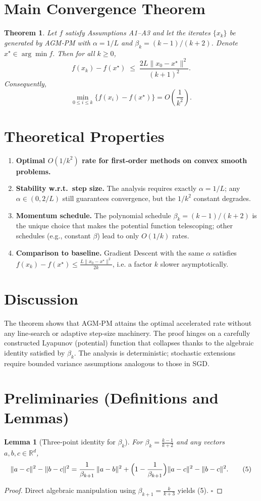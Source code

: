\documentclass{article}
\newtheorem{theorem}{Theorem}
\newtheorem{lemma}{Lemma}
\newcommand{\R}{\mathbb{R}}
\begin{document}
\section*{Main Convergence Theorem}
\begin{theorem}
\label{thm:rate}
Let $f$ satisfy Assumptions A1–A3 and let the iterates $\{x_k\}$ be generated by AGM‑PM with $\alpha=1/L$ and $\beta_k=(k-1)/(k+2)$. Denote $x^{\star}\in\arg\min f$. Then for all $k\ge 0$,
\[
f(x_k)-f(x^{\star})\;\le\;\frac{2L\|x_0-x^{\star}\|^{2}}{(k+1)^{2}}.
\tag{4}
\]
Consequently,
\[
\min_{0\le i\le k} \bigl\{f(x_i)-f(x^{\star})\bigr\}=O\!\left(\frac{1}{k^{2}}\right).
\]
\end{theorem}

\section*{Theoretical Properties}
\begin{enumerate}[label=\textbf{P\arabic*:}, leftmargin=*]
\item \textbf{Optimal $O(1/k^{2})$ rate for first‑order methods on convex smooth problems.}
\item \textbf{Stability w.r.t.\ step size.} The analysis requires exactly $\alpha=1/L$; any $\alpha\in(0,2/L)$ still guarantees convergence, but the $1/k^{2}$ constant degrades.
\item \textbf{Momentum schedule.} The polynomial schedule $\beta_k=(k-1)/(k+2)$ is the unique choice that makes the potential function telescoping; other schedules (e.g., constant $\beta$) lead to only $O(1/k)$ rates.
\item \textbf{Comparison to baseline.} Gradient Descent with the same $\alpha$ satisfies $f(x_k)-f(x^{\star})\le \frac{L\|x_0-x^{\star}\|^{2}}{2k}$, i.e. a factor $k$ slower asymptotically.
\end{enumerate}

\section*{Discussion}
The theorem shows that AGM‑PM attains the optimal accelerated rate without any line‑search or adaptive step‑size machinery. The proof hinges on a carefully constructed Lyapunov (potential) function that collapses thanks to the algebraic identity satisfied by $\beta_k$. The analysis is deterministic; stochastic extensions require bounded variance assumptions analogous to those in SGD.

\newpage
\section*{Preliminaries (Definitions and Lemmas)}
\begin{lemma}[Three‑point identity for $\beta_k$]
\label{lem:beta}
For $\beta_k=\frac{k-1}{k+2}$ and any vectors $a,b,c\in\R^{d}$,
\[
\|a - c\|^{2} - \|b-c\|^{2}
= \frac{1}{\beta_{k+1}}\,\|a-b\|^{2} + \Bigl(1-\frac{1}{\beta_{k+1}}\Bigr)\|a-c\|^{2} - \|b-c\|^{2}.
\tag{5}
\]
\end{lemma}
\begin{proof}
Direct algebraic manipulation using $\beta_{k+1}=\frac{k}{k+3}$ yields (5). $\square$
\end{proof}
\end{document}
